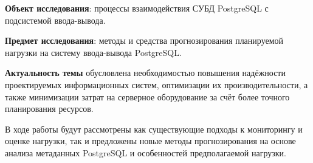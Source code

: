 \vspace{5mm}

\textbf{Объект исследования}: процессы взаимодействия СУБД PostgreSQL с подсистемой ввода-вывода.

\textbf{Предмет исследования}: методы и средства прогнозирования планируемой нагрузки на систему ввода-вывода PostgreSQL.

\vspace{5mm}

\textbf{Актуальность темы} обусловлена необходимостью повышения надёжности проектируемых информационных систем, оптимизации их производительности, а также минимизации затрат на серверное оборудование за счёт более точного планирования ресурсов.

\vspace{5mm}

В ходе работы будут рассмотрены как существующие подходы к мониторингу и оценке нагрузки, так и предложены новые методы прогнозирования на основе анализа метаданных PostgreSQL и особенностей предполагаемой нагрузки.
